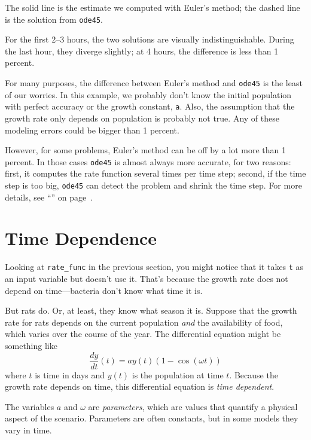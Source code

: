 The solid line is the estimate we computed with Euler's method; the dashed line is the solution from \lstinline{ode45}.

For the first 2--3 hours, the two solutions are visually indistinguishable.  During the last hour, they diverge slightly; at 4 hours, the difference is less than 1 percent.

For many purposes, the difference between Euler's method and \lstinline{ode45} is the least of our worries.  In this example, we probably don't know the initial population with perfect accuracy or the growth constant, \lstinline{a}.  Also, the assumption that the growth rate only depends on population is probably not true.  Any of these modeling errors could be bigger than 1 percent.

However, for some problems, Euler's method can be off by a lot more than 1 percent.
In those cases \lstinline{ode45} is almost always more accurate, for two reasons: first, it computes the rate function several times per time step; second, if the time step is too big, \lstinline{ode45} can detect the problem and shrink the time step.  For more details, see ``'' on page~\pageref{howode45}.


\section{Time Dependence}

Looking at \lstinline{rate_func} in the previous section, you might notice that it takes \lstinline{t} as an input variable but doesn't use it.  That's because the growth rate does not depend on time---bacteria don't know what time it is.


But rats do.  Or, at least, they know what season it is.
Suppose that the growth rate for rats depends on the current population \emph{and} the availability of food, which varies over the course of the year.
The differential equation might be something like
%
\begin{equation*}
\frac{dy}{dt}(t) = a y(t) \left(1 - \cos (\omega t) \right)
\end{equation*}
%
where $t$ is time in days and $y(t)$ is the population at time $t$.
Because the growth rate depends on time, this differential equation is \emph{time dependent}.

The variables $a$ and $\omega$ are \emph{parameters}, which are values that
quantify a physical aspect of the scenario.  Parameters are often constants, but in some models they vary in time.


